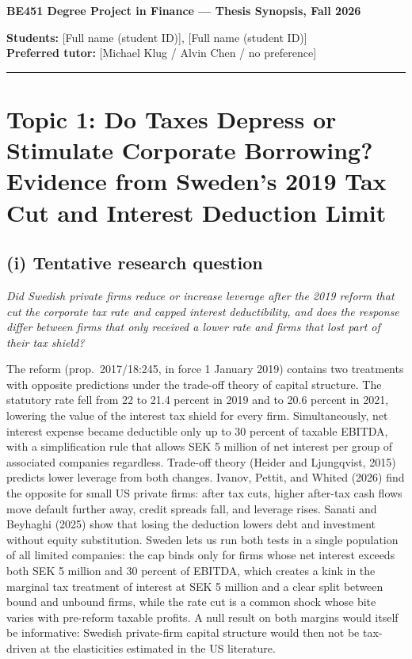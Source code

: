 \documentclass[12pt,a4paper]{article}
\begin{document}
{\large\bfseries BE451 Degree Project in Finance --- Thesis Synopsis, Fall 2026}

\textbf{Students:} [Full name (student ID)], [Full name (student ID)] \\
\textbf{Preferred tutor:} [Michael Klug / Alvin Chen / no preference]

\vspace{4pt}\hrule\vspace{4pt}

\section{Topic 1: Do Taxes Depress or Stimulate Corporate Borrowing? Evidence from Sweden's 2019 Tax Cut and Interest Deduction Limit}

\subsection{(i) Tentative research question}

\emph{Did Swedish private firms reduce or increase leverage after the 2019 reform that cut the corporate tax rate and capped interest deductibility, and does the response differ between firms that only received a lower rate and firms that lost part of their tax shield?}

The reform (prop.\ 2017/18:245, in force 1 January 2019) contains two treatments with opposite predictions under the trade-off theory of capital structure. The statutory rate fell from 22 to 21.4 percent in 2019 and to 20.6 percent in 2021, lowering the value of the interest tax shield for every firm. Simultaneously, net interest expense became deductible only up to 30 percent of taxable EBITDA, with a simplification rule that allows SEK 5 million of net interest per group of associated companies regardless. Trade-off theory (Heider and Ljungqvist, 2015) predicts lower leverage from both changes. Ivanov, Pettit, and Whited (2026) find the opposite for small US private firms: after tax cuts, higher after-tax cash flows move default further away, credit spreads fall, and leverage rises. Sanati and Beyhaghi (2025) show that losing the deduction lowers debt and investment without equity substitution. Sweden lets us run both tests in a single population of all limited companies: the cap binds only for firms whose net interest exceeds both SEK 5 million and 30 percent of EBITDA, which creates a kink in the marginal tax treatment of interest at SEK 5 million and a clear split between bound and unbound firms, while the rate cut is a common shock whose bite varies with pre-reform taxable profits. A null result on both margins would itself be informative: Swedish private-firm capital structure would then not be tax-driven at the elasticities estimated in the US literature.
\end{document}

